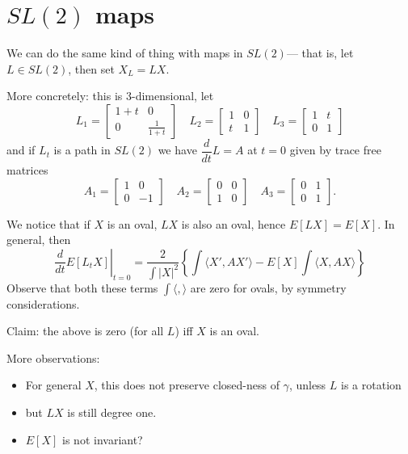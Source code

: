 \documentclass[12pt, a4paper]{amsart}
\theoremstyle{remark}
\begin{document}
\section*{$SL(2)$ maps}
We can do the same kind of thing with maps in $SL(2)$--- that is, let $L\in SL(2)$, then set $X_L=LX$.  

More concretely:   this is 3-dimensional, let 
\begin{equation*}
L_1=\left[\begin{array}{cc}
 1+t &0   \\
 0& \frac{1}{1+t}
\end{array}\right]
\quad L_2=
\left[\begin{array}{cc}
 1&0   \\
 t & 1
\end{array}\right]
\quad  L_3=
\left[\begin{array}{cc}
1 & t   \\ 0 & 1
\end{array}\right]
\end{equation*}
and if $L_t$ is a path in $SL(2)$ we have $\dfrac{d}{dt} L =A $ at $t=0$ given by  trace free matrices
\begin{equation*}
A_1=\left[\begin{array}{cc}
 1 & 0  \\ 0 & -1
\end{array}\right]
\quad A_2=
\left[\begin{array}{cc}
0 & 0  \\ 1 & 0
\end{array}\right]
\quad A_3=
\left[\begin{array}{cc}
0 & 1  \\ 0& 1
\end{array}\right].
\end{equation*}

We notice that if $X$ is an oval, $LX$ is also an oval, hence $E[LX]=E[X]$.   In general, 
then 
\begin{equation} \label{SL2 first variation}
\left. \dfrac{d}{dt} E[L_t X]\right|_{t=0} = \frac2{\int|X|^2} \left\lbrace \int \langle X',AX'\rangle - E[X] \int \langle X,AX\rangle \right\rbrace
\end{equation}
Observe that both these terms $\int \langle , \rangle$ are zero for ovals, by symmetry considerations.

Claim:   the above is zero (for all $L$) iff $X$ is an oval.   

More observations:
\begin{itemize}
\item For general $X$, this does not preserve closed-ness of $\gamma$, unless $L$ is a rotation
\item but $LX$ is still degree one.  
\item $E[X]$ is not invariant?
\end{itemize}
\end{document}
